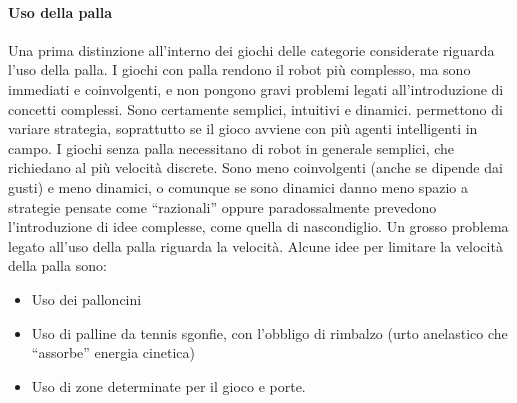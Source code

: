 \paragraph{Uso della palla} Una prima distinzione all'interno dei giochi delle categorie considerate riguarda l'uso della palla. I giochi con palla rendono il robot più complesso, ma sono immediati e coinvolgenti, e non pongono gravi problemi legati all'introduzione di concetti complessi. Sono certamente semplici, intuitivi e dinamici. permettono di variare strategia, soprattutto se il gioco avviene con più agenti intelligenti in campo.
I giochi senza palla necessitano di robot in generale semplici, che richiedano al più velocità discrete. Sono meno coinvolgenti (anche se dipende dai gusti) e meno dinamici, o comunque se sono dinamici danno meno spazio a strategie pensate come ``razionali'' oppure paradossalmente prevedono l'introduzione di idee complesse, come quella di nascondiglio.
Un grosso problema legato all'uso della palla riguarda la velocità. Alcune idee per limitare la velocità della palla sono:
\begin{itemize}
\item Uso dei palloncini
\item Uso di palline da tennis sgonfie, con l’obbligo di rimbalzo (urto anelastico che “assorbe” energia cinetica)
\item Uso di zone determinate per il gioco e porte.
\end{itemize}

